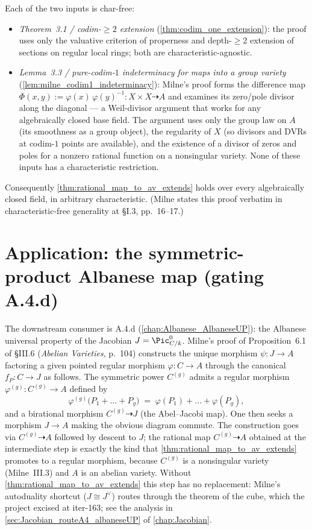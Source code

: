 Each of the two inputs is char-free:
\begin{itemize}
  \item \emph{Theorem~3.1 / codim-\(\geq 2\) extension} (\cref{thm:codim_one_extension}):
    the proof uses only the valuative criterion of properness and depth-\(\geq 2\) extension
    of sections on regular local rings; both are characteristic-agnostic.
  \item \emph{Lemma~3.3 / pure-codim-\(1\) indeterminacy for maps into a group variety}
    (\cref{lem:milne_codim1_indeterminacy}): Milne's proof forms the difference map
    \(\Phi(x, y) := \varphi(x)\,\varphi(y)^{-1} \colon X \times X \dashrightarrow A\) and
    examines its zero/pole divisor along the diagonal --- a Weil-divisor argument that
    works for any algebraically closed base field. The argument uses only the group law
    on \(A\) (its smoothness as a group object), the regularity of \(X\) (so divisors and
    DVRs at codim-\(1\) points are available), and the existence of a divisor of zeros and
    poles for a nonzero rational function on a nonsingular variety. None of these inputs
    has a characteristic restriction.
\end{itemize}
Consequently \cref{thm:rational_map_to_av_extends} holds over every algebraically closed
field, in arbitrary characteristic. (Milne states this proof verbatim in characteristic-free
generality at \S I.3, pp.~16--17.)

\section{Application: the symmetric-product Albanese map (gating A.4.d)}
\label{sec:thm32_application_to_a4d}

The downstream consumer is A.4.d (\cref{chap:Albanese_AlbaneseUP}):
the Albanese universal property of the Jacobian \(J = \Pic^0_{C/k}\). Milne's proof of
Proposition~6.1 of \S III.6 (\emph{Abelian Varieties}, p.~104) constructs the unique
morphism \(\psi \colon J \to A\) factoring a given pointed regular morphism
\(\varphi \colon C \to A\) through the canonical \(f_P \colon C \to J\) as follows. The
symmetric power \(C^{(g)}\) admits a regular morphism \(\varphi^{(g)} \colon C^{(g)} \to A\)
defined by
\[
  \varphi^{(g)}\bigl(P_1 + \dots + P_g\bigr) \;=\; \varphi(P_1) + \dots + \varphi(P_g),
\]
and a birational morphism \(C^{(g)} \dashrightarrow J\) (the Abel--Jacobi map). One then
seeks a morphism \(J \to A\) making the obvious diagram commute. The construction goes via
\(C^{(g)} \dashrightarrow A\) followed by descent to \(J\); the rational map
\(C^{(g)} \dashrightarrow A\) obtained at the intermediate step is exactly the kind that
\cref{thm:rational_map_to_av_extends} promotes to a regular morphism, because \(C^{(g)}\) is
a nonsingular variety (Milne~III.3) and \(A\) is an abelian variety. Without
\cref{thm:rational_map_to_av_extends} this step has no replacement: Milne's autoduality
shortcut (\(J \cong J^\vee\)) routes through the theorem of the cube, which the project
excised at iter-163; see the analysis in \cref{sec:Jacobian_routeA4_albaneseUP} of
\cref{chap:Jacobian}.

